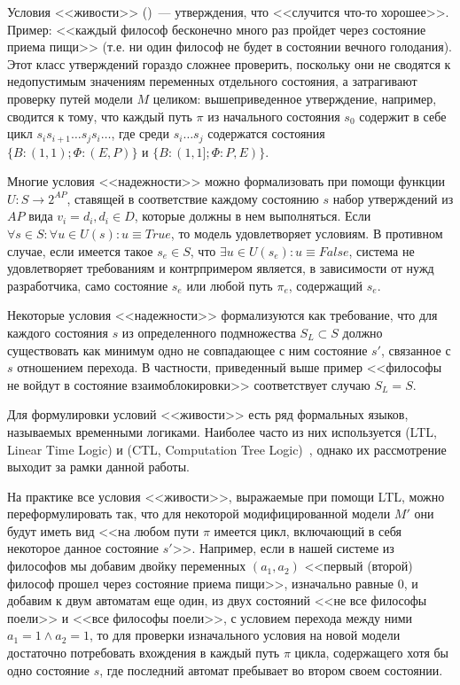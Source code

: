 Условия <<живости>> ()~--- утверждения, что <<случится что-то
хорошее>>. Пример: <<каждый философ бесконечно много раз пройдет через состояние приема
пищи>> (т.е. ни один философ не будет в состоянии вечного голодания). Этот класс
утверждений гораздо сложнее проверить, поскольку они не сводятся к недопустимым значениям
переменных отдельного состояния, а затрагивают проверку путей модели $M$ целиком:
вышеприведенное утверждение, например, сводится к тому, что каждый путь $\pi$ из
начального состояния $s_0$ содержит в себе цикл $s_is_{i+1}\ldots s_js_i\ldots$, где среди
$s_i\ldots s_j$ содержатся состояния $\{B: (1, 1); \Phi: (E, P)\}$ и $\{B: (1, 1]; \Phi:
P, E)\}$.

Многие условия <<надежности>> можно формализовать при помощи функции $U\colon S
\rightarrow 2^{AP}$, ставящей в соответствие каждому состоянию $s$ набор утверждений из
$AP$ вида $v_i = d_i, d_i \in D$, которые должны в нем выполняться. Если $\forall s \in
S:\forall u \in U(s):u \equiv True$, то модель удовлетворяет условиям. В противном случае,
если имеется такое $s_e \in S$, что $\exists u \in U(s_e)\colon u \equiv False$, система
не удовлетворяет требованиям и контрпримером является, в зависимости от нужд разработчика,
само состояние $s_e$ или любой путь $\pi_e$, содержащий $s_e$.

Некоторые условия <<надежности>> формализуются как требование, что для каждого состояния
$s$ из определенного подмножества $S_L \subset S$ должно существовать как минимум одно не
совпадающее с ним состояние $s'$, связанное с $s$ отношением перехода. В частности,
приведенный выше пример <<философы не войдут в состояние взаимоблокировки>> соответствует
случаю $S_L = S$.

Для формулировки условий <<живости>> есть ряд формальных языков, называемых временными
логиками. Наиболее часто из них используется  (LTL, Linear
Time Logic) и  (CTL, Computation Tree
Logic)~\cite{Clarke, Velder}, однако их рассмотрение выходит за рамки данной
работы.

На практике все условия <<живости>>, выражаемые при помощи LTL, можно переформулировать
так, что для некоторой модифицированной модели $M'$ они будут иметь вид <<на любом пути
$\pi$ имеется цикл, включающий в себя некоторое данное состояние $s'$>>. Например, если в
нашей системе из философов мы добавим двойку переменных $(a_1, a_2)$ <<первый (второй)
философ прошел через состояние приема пищи>>, изначально равные $0$, и добавим к двум
автоматам еще один, из двух состояний <<не все философы поели>> и <<все философы поели>>,
с условием перехода между ними $a_1 = 1 \wedge a_2 = 1$, то для проверки изначального
условия на новой модели достаточно потребовать вхождения в каждый путь $\pi$ цикла,
содержащего хотя бы одно состояние $s$, где последний автомат пребывает во втором своем
состоянии.

